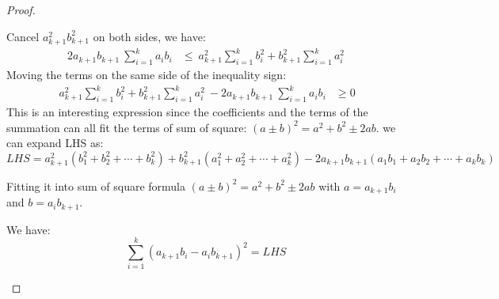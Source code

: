 \begin{proof}
\begin{remark}
    \noindent Cancel $a_{k+1}^2b_{k+1}^2$ on both sides, we have:
    \begin{align*}
        2a_{k+1} b_{k+1} \ \sum _{i=1}^{k} a_{i} b_{i} & \leq \ a_{k+1}^{2}\sum _{i=1}^{k} b_{i}^{2} +b_{k+1}^{2}\sum _{i=1}^{k} a_{i}^{2}
    \end{align*}
    Moving the terms on the same side of the inequality sign:
    \begin{align*}
        \ a_{k+1}^{2}\sum _{i=1}^{k} b_{i}^{2} +b_{k+1}^{2}\sum _{i=1}^{k} a_{i}^{2} \ -2a_{k+1} b_{k+1} \ \sum _{i=1}^{k} a_{i} b_{i} & \geq 0
        \end{align*}
    This is an interesting expression since the coefficients and the terms of the summation can all fit the
    terms of sum of square: $(a\pm b)^2 = a^2+b^2\pm 2ab$.
    we can expand LHS as:
    $$
        LHS =a_{k+1}^{2}\left( b_{1}^{2} +b_{2}^{2} +\cdots +b_{k}^{2}\right) +b_{k+1}^{2}\left( a_{1}^{2} +a_{2}^{2} +\cdots +a_{k}^{2}\right) -2a_{k+1} b_{k+1}( a_{1} b_{1} +a_{2} b_{2} +\cdots +a_{k} b_{k})
    $$
    
    Fitting it into sum of square formula $(a\pm b)^2 = a^2+b^2\pm 2ab$ with $a = a_{k+1}b_i$ and $b=a_ib_{k+1}$.
    
    \noindent We have: 
    \[
    \sum_{i=1}^{k} (a_{k+1}b_i - a_ib_{k+1})^2 = LHS
    \]
\end{remark}


\end{proof}


